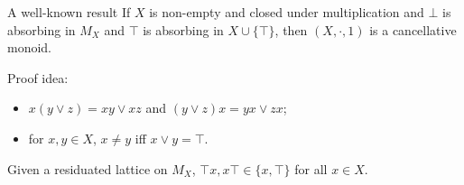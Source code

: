 \documentclass[professionalfont, handout, 12pt]{beamer} %
\theoremstyle{plain}
\theoremstyle{definition}
\newcommand{\jn}{\vee}
\begin{document}
\begin{frame}
    \begin{block}{A well-known result}
        If $X$ is non-empty and closed under multiplication and $\bot$ is absorbing in $M_X$ and $\top$ is absorbing in $X \cup \{\top\}$, then $(X, \cdot, 1)$ is a cancellative monoid.
    \end{block}
    \pause
    \vspace{20pt}

    Proof idea:

    \begin{itemize}
        \item $x (y \jn z) = xy \jn xz$ and $(y \jn z) x = yx \jn zx$;

        \item for $x, y \in X$, $x \neq y$ iff $x \jn y = \top$.
    \end{itemize}
    \pause
    \vspace{20pt}

    Given a residuated lattice on $M_X$, $\top x, x \top \in \{x, \top\}$ for all $x \in X$.

    
\end{frame}
\end{document}

